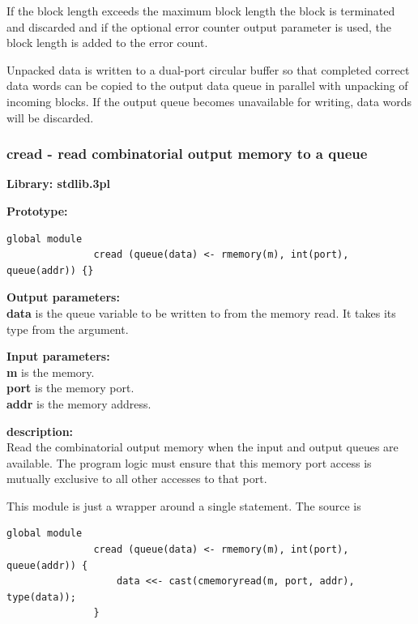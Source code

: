             If the block length exceeds the maximum block length the block is
            terminated and discarded and if the optional error counter output
            parameter is used, the block length is added to the error count.

            Unpacked data is written to a dual-port circular buffer so that
            completed correct data words can be copied to the output data queue
            in parallel with unpacking of incoming blocks. If the output queue
            becomes unavailable for writing, data words will be discarded.


    
  
        \subsubsection{cread - read combinatorial output memory to a
                                                        queue}\label{sec:lmcread}

            {\bf Library: stdlib.3pl}


            {\bf Prototype:} \\
            \vsp
            \begin{lstlisting}[gobble=12, language=threepl]
               global module
               cread (queue(data) <- rmemory(m), int(port), queue(addr)) {}
            \end{lstlisting}

            {\bf Output parameters:} \\
            {\bf data} is the queue variable to be written to from the memory
            read. It takes its type from the argument.

            {\bf Input parameters:} \\
            {\bf m} is the memory.\\
            {\bf port} is the memory port.\\
            {\bf addr} is the memory address.

            {\bf description:} \\
            Read the combinatorial output memory when the input and output
            queues are available. The program logic must ensure that this
            memory port access is mutually exclusive to all other accesses
            to that port.
            
            This module is just a wrapper around a single statement. The source
            is
            \begin{lstlisting}[gobble=12, language=threepl]
               global module
               cread (queue(data) <- rmemory(m), int(port), queue(addr)) {
                   data <<- cast(cmemoryread(m, port, addr), type(data));
               }
            \end{lstlisting}
                        
